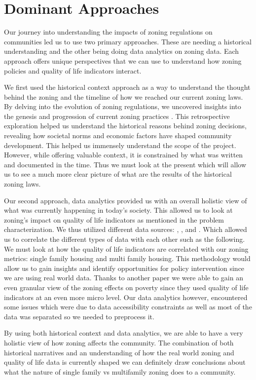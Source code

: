 \documentclass[titlepage]{article}
\begin{document}
\section{Dominant Approaches}
Our journey into understanding the impacts of zoning regulations on communities led us to use two primary approaches. These are needing a historical understanding and the other being doing data analytics on zoning data. Each approach offers unique perspectives that we can use to understand how zoning policies and quality of life indicators interact.

We first used the historical context approach as a way to understand the thought behind the zoning and the timeline of how we reached our current zoning laws. By delving into the evolution of zoning regulations, we uncovered insights into the genesis and progression of current zoning practices \cite{freemark}. This retrospective exploration helped us understand the historical reasons behind zoning decisions, revealing how societal norms and economic factors have shaped community development. This helped us immensely understand the scope of the project. However, while offering valuable context, it is constrained by what was written and documented in the time. Thus we must look at the present which will allow us to see a much more clear picture of what are the results of the historical zoning laws. 

Our second approach, data analytics provided us with an overall holistic view of what was currently happening in today’s society. This allowed us to look at zoning's impact on quality of life indicators as mentioned in the problem characterization. We thus utilized different data sources: \cite{kaggle}, \cite{isqols}, \cite{koordinates} and \cite{uscensus}. Which allowed us to correlate the different types of data with each other such as the following. We must look at how the quality of life indicators are correlated with our zoning metrics: single family housing and multi family housing. This methodology would allow us to gain insights and identify opportunities for policy intervention since we are using real world data. Thanks to another paper \cite{zoning} we were able to gain an even granular view of the zoning effects on poverty since they used quality of life indicators at an even more micro level. Our data analytics however, encountered some issues which were due to data accessibility constraints as well as most of the data was separated so we needed to preprocess it.

By using both historical context and data analytics, we are able to have a very holistic view of how  zoning affects the community. The combination of both historical narratives and an understanding of how the real world zoning and quality of life data is currently shaped we can definitely draw conclusions about what the nature of single family vs multifamily zoning does to a community.
\end{document}
